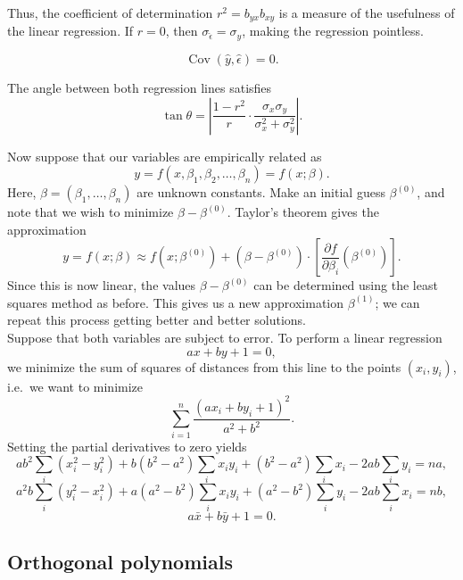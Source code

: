 \documentclass[11pt]{article}
\DeclareMathOperator{\cov}{Cov}
\theoremstyle{definition}
\theoremstyle{remark}
\numberwithin{equation}{section}
\begin{document}
    Thus, the coefficient of determination $r^2 = b_{yx}b_{xy}$ is a measure of the
    usefulness of the linear regression. If $r = 0$, then $\sigma_{\hat{\epsilon}} =
    \sigma_y$, making the regression pointless.

    \begin{lemma}
        \[
            \cov(\hat{y}, \hat{\epsilon}) = 0.  
        \]
    \end{lemma}

    \begin{lemma}
        The angle between both regression lines satisfies \[
            \tan\theta = \left|\frac{1 - r^2}{r} \cdot
            \frac{\sigma_x\sigma_y}{\sigma_x^2 + \sigma_y^2}\right|.
        \] 
    \end{lemma}


    Now suppose that our variables are empirically related as \[
        y = f(x, \beta_1, \beta_2, \dots, \beta_n) = f(x; \beta).
    \] Here, $\beta = (\beta_1, \dots, \beta_n)$ are unknown constants. Make an
    initial guess $\beta^{(0)}$, and note that we wish to minimize $\beta -
    \beta^{(0)}$. Taylor's theorem gives the approximation \[
        y = f(x; \beta) \approx f(x; \beta^{(0)}) + (\beta - \beta^{(0)})\cdot
        \left[\frac{\partial f}{\partial \beta_i}(\beta^{(0)})\right].
    \] Since this is now linear, the values $\beta - \beta^{(0)}$ can be determined
    using the least squares method as before. This gives us a new approximation
    $\beta^{(1)}$; we can repeat this process getting better and better solutions. \\


    Suppose that both variables are subject to error. To perform a linear regression
    \[
        ax + by + 1 = 0,
    \] we minimize the sum of squares of distances from this line to the points
    $(x_i, y_i)$, i.e.\ we want to minimize \[
        \sum_{i = 1}^n \frac{(ax_i + by_i + 1)^2}{a^2 + b^2}.
    \] Setting the partial derivatives to zero yields \[
        ab^2\sum_i (x_i^2 - y_i^2) + b(b^2 - a^2)\sum_i x_iy_i + (b^2 - a^2)\sum_ix_i
        - 2ab\sum_i y_i = na,
    \] \[
        a^2b\sum_i (y_i^2 - x_i^2) + a(a^2 - b^2)\sum_i x_iy_i + (a^2 - b^2)\sum_iy_i
        - 2ab\sum_i x_i = nb,
    \] \[
        a\bar{x} + b\bar{y} + 1 = 0.
    \] 

    
    \subsection{Orthogonal polynomials}
    
\end{document}

